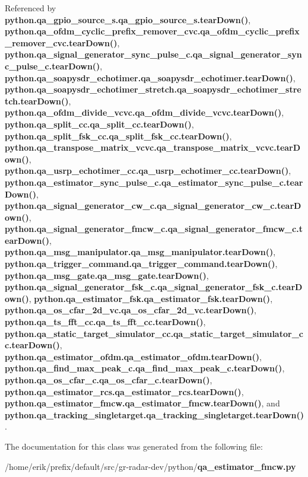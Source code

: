 Referenced by {\bf python.\+qa\+\_\+gpio\+\_\+source\+\_\+s.\+qa\+\_\+gpio\+\_\+source\+\_\+s.\+tear\+Down()}, {\bf python.\+qa\+\_\+ofdm\+\_\+cyclic\+\_\+prefix\+\_\+remover\+\_\+cvc.\+qa\+\_\+ofdm\+\_\+cyclic\+\_\+prefix\+\_\+remover\+\_\+cvc.\+tear\+Down()}, {\bf python.\+qa\+\_\+signal\+\_\+generator\+\_\+sync\+\_\+pulse\+\_\+c.\+qa\+\_\+signal\+\_\+generator\+\_\+sync\+\_\+pulse\+\_\+c.\+tear\+Down()}, {\bf python.\+qa\+\_\+soapysdr\+\_\+echotimer.\+qa\+\_\+soapysdr\+\_\+echotimer.\+tear\+Down()}, {\bf python.\+qa\+\_\+soapysdr\+\_\+echotimer\+\_\+stretch.\+qa\+\_\+soapysdr\+\_\+echotimer\+\_\+stretch.\+tear\+Down()}, {\bf python.\+qa\+\_\+ofdm\+\_\+divide\+\_\+vcvc.\+qa\+\_\+ofdm\+\_\+divide\+\_\+vcvc.\+tear\+Down()}, {\bf python.\+qa\+\_\+split\+\_\+cc.\+qa\+\_\+split\+\_\+cc.\+tear\+Down()}, {\bf python.\+qa\+\_\+split\+\_\+fsk\+\_\+cc.\+qa\+\_\+split\+\_\+fsk\+\_\+cc.\+tear\+Down()}, {\bf python.\+qa\+\_\+transpose\+\_\+matrix\+\_\+vcvc.\+qa\+\_\+transpose\+\_\+matrix\+\_\+vcvc.\+tear\+Down()}, {\bf python.\+qa\+\_\+usrp\+\_\+echotimer\+\_\+cc.\+qa\+\_\+usrp\+\_\+echotimer\+\_\+cc.\+tear\+Down()}, {\bf python.\+qa\+\_\+estimator\+\_\+sync\+\_\+pulse\+\_\+c.\+qa\+\_\+estimator\+\_\+sync\+\_\+pulse\+\_\+c.\+tear\+Down()}, {\bf python.\+qa\+\_\+signal\+\_\+generator\+\_\+cw\+\_\+c.\+qa\+\_\+signal\+\_\+generator\+\_\+cw\+\_\+c.\+tear\+Down()}, {\bf python.\+qa\+\_\+signal\+\_\+generator\+\_\+fmcw\+\_\+c.\+qa\+\_\+signal\+\_\+generator\+\_\+fmcw\+\_\+c.\+tear\+Down()}, {\bf python.\+qa\+\_\+msg\+\_\+manipulator.\+qa\+\_\+msg\+\_\+manipulator.\+tear\+Down()}, {\bf python.\+qa\+\_\+trigger\+\_\+command.\+qa\+\_\+trigger\+\_\+command.\+tear\+Down()}, {\bf python.\+qa\+\_\+msg\+\_\+gate.\+qa\+\_\+msg\+\_\+gate.\+tear\+Down()}, {\bf python.\+qa\+\_\+signal\+\_\+generator\+\_\+fsk\+\_\+c.\+qa\+\_\+signal\+\_\+generator\+\_\+fsk\+\_\+c.\+tear\+Down()}, {\bf python.\+qa\+\_\+estimator\+\_\+fsk.\+qa\+\_\+estimator\+\_\+fsk.\+tear\+Down()}, {\bf python.\+qa\+\_\+os\+\_\+cfar\+\_\+2d\+\_\+vc.\+qa\+\_\+os\+\_\+cfar\+\_\+2d\+\_\+vc.\+tear\+Down()}, {\bf python.\+qa\+\_\+ts\+\_\+fft\+\_\+cc.\+qa\+\_\+ts\+\_\+fft\+\_\+cc.\+tear\+Down()}, {\bf python.\+qa\+\_\+static\+\_\+target\+\_\+simulator\+\_\+cc.\+qa\+\_\+static\+\_\+target\+\_\+simulator\+\_\+cc.\+tear\+Down()}, {\bf python.\+qa\+\_\+estimator\+\_\+ofdm.\+qa\+\_\+estimator\+\_\+ofdm.\+tear\+Down()}, {\bf python.\+qa\+\_\+find\+\_\+max\+\_\+peak\+\_\+c.\+qa\+\_\+find\+\_\+max\+\_\+peak\+\_\+c.\+tear\+Down()}, {\bf python.\+qa\+\_\+os\+\_\+cfar\+\_\+c.\+qa\+\_\+os\+\_\+cfar\+\_\+c.\+tear\+Down()}, {\bf python.\+qa\+\_\+estimator\+\_\+rcs.\+qa\+\_\+estimator\+\_\+rcs.\+tear\+Down()}, {\bf python.\+qa\+\_\+estimator\+\_\+fmcw.\+qa\+\_\+estimator\+\_\+fmcw.\+tear\+Down()}, and {\bf python.\+qa\+\_\+tracking\+\_\+singletarget.\+qa\+\_\+tracking\+\_\+singletarget.\+tear\+Down()}.



The documentation for this class was generated from the following file\+:\begin{DoxyCompactItemize}
\item 
/home/erik/prefix/default/src/gr-\/radar-\/dev/python/{\bf qa\+\_\+estimator\+\_\+fmcw.\+py}\end{DoxyCompactItemize}
